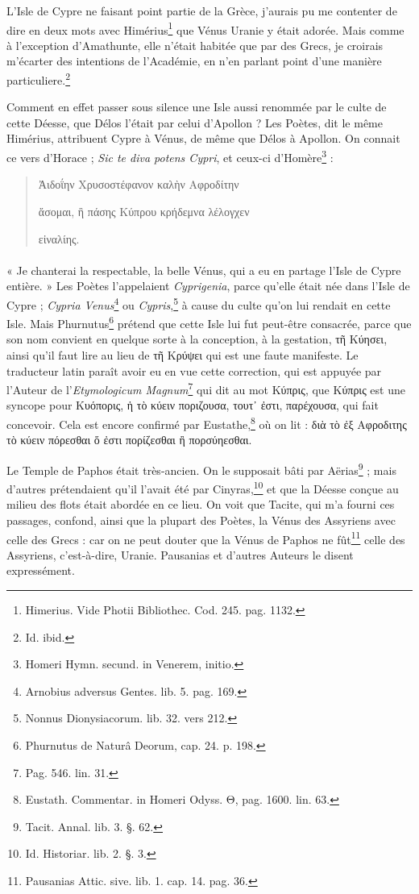 \documentclass[a4paper, 18pt, oneside]{article}
\begin{document}
L'Isle de Cypre ne faisant point partie de la Grèce, j'aurais pu me contenter de dire en deux mots avec Himérius\footnote{Himerius. Vide Photii Bibliothec. Cod. 245. pag. 1132.} que Vénus Uranie y était adorée. Mais comme à l'exception d'Amathunte, elle n'était habitée que par des Grecs, je croirais m'écarter des intentions de l'Académie, en n'en parlant point d'une manière particuliere.\footnote{Id. ibid.}

Comment en effet passer sous silence une Isle aussi renommée par le culte de cette Déesse, que Délos l'était par celui d'Apollon ? Les Poètes, dit le même Himérius, attribuent Cypre à Vénus, de même que Délos à Apollon. On connait ce vers d'Horace ; \emph{Sic te diva potens Cypri}, et ceux-ci d'Homère\footnote{Homeri Hymn. secund. in Venerem, initio.} :
\begin{quotation}
Ἀιδοΐην Χρυσοστέφανον καλὴν Αφροδίτην

ἄσομαι, ἣ πάσης Κύπρου κρήδεμνα λέλογχεν

εἰναλίης.
\end{quotation}
\paragraph{}
« Je chanterai la respectable, la belle Vénus, qui a eu en partage l'Isle de Cypre entière. » Les Poètes l'appelaient \emph{Cyprigenia}, parce qu'elle était née dans l'Isle de Cypre ; \emph{Cypria Venus}\footnote{Arnobius adversus Gentes. lib. 5. pag. 169.} ou \emph{Cypris},\footnote{Nonnus Dionysiacorum. lib. 32. vers 212.} à cause du culte qu'on lui rendait en cette Isle. Mais Phurnutus\footnote{Phurnutus de Naturâ Deorum, cap. 24. p. 198.} prétend que cette Isle lui fut peut-être consacrée, parce que son nom convient en quelque sorte à la conception, à la gestation, τῆ Κύησει, ainsi qu'il faut lire au lieu de τῆ Κρύψει qui est une faute manifeste. Le traducteur latin paraît avoir eu en vue cette correction, qui est appuyée par l'Auteur de l'\emph{Etymologicum Magnum}\footnote{Pag. 546. lin. 31.} qui dit au mot Κύπρις, que Κύπρις est une syncope pour Κυόπορις, ἡ τὸ κύειν ποριζουσα, τουτ᾿ ἐστι, παρέχουσα, qui fait concevoir. Cela est encore confirmé par Eustathe,\footnote{Eustath. Commentar. in Homeri Odyss. Θ, pag. 1600. lin. 63.} où on lit : διὰ τὸ ἐξ Αφροδιτης τὸ κύειν πόρεσθαι ὅ ἐστι πορίζεσθαι ἢ πορσύηεσθαι.

Le Temple de Paphos était très-ancien. On le supposait bâti par Aërias\footnote{Tacit. Annal. lib. 3. §. 62.} ; mais d'autres prétendaient qu'il l'avait été par Cinyras,\footnote{Id. Historiar. lib. 2. §. 3.} et que la Déesse conçue au milieu des flots était abordée en ce lieu. On voit que Tacite, qui m'a fourni ces passages, confond, ainsi que la plupart des Poètes, la Vénus des Assyriens avec celle des Grecs : car on ne peut douter que la Vénus de Paphos ne fût\footnote{Pausanias Attic. sive. lib. 1. cap. 14. pag. 36.} celle des Assyriens, c'est-à-dire, Uranie. Pausanias et d'autres Auteurs le disent expressément.
\end{document}
